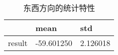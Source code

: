 \begin{table}[htbp]
\centering
\begin{tabular}{lll}
  \toprule
       & mean       & std      \\
	 \midrule
result & -59.601250 & 2.126018\\
\bottomrule
\end{tabular}
\caption{东西方向的统计特性}
  \label{table:west-east-statistic}
\end{table}
